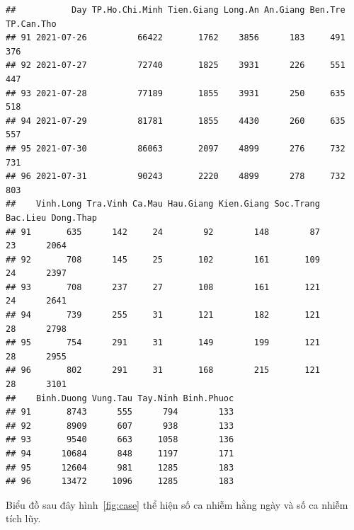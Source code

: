 \documentclass[../thesis.tex]{subfiles}
\begin{document}
\begin{verbatim}
##           Day TP.Ho.Chi.Minh Tien.Giang Long.An An.Giang Ben.Tre TP.Can.Tho
## 91 2021-07-26          66422       1762    3856      183     491        376
## 92 2021-07-27          72740       1825    3931      226     551        447
## 93 2021-07-28          77189       1855    3931      250     635        518
## 94 2021-07-29          81781       1855    4430      260     635        557
## 95 2021-07-30          86063       2097    4899      276     732        731
## 96 2021-07-31          90243       2220    4899      278     732        803
##    Vinh.Long Tra.Vinh Ca.Mau Hau.Giang Kien.Giang Soc.Trang Bac.Lieu Dong.Thap
## 91       635      142     24        92        148        87       23      2064
## 92       708      145     25       102        161       109       24      2397
## 93       708      237     27       108        161       121       24      2641
## 94       739      255     31       121        182       121       28      2798
## 95       754      291     31       149        199       121       28      2955
## 96       802      291     31       168        215       121       28      3101
##    Binh.Duong Vung.Tau Tay.Ninh Binh.Phuoc
## 91       8743      555      794        133
## 92       8909      607      938        133
## 93       9540      663     1058        136
## 94      10684      848     1197        171
## 95      12604      981     1285        183
## 96      13472     1096     1285        183
\end{verbatim}

Biểu đồ sau đây hình~\ref{fig:case} thể hiện số ca nhiễm hằng ngày và số ca nhiễm tích lũy. 
\end{document}
